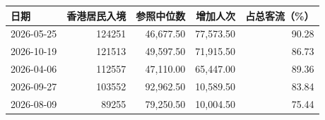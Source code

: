 \begin{tabular}{lrrrr}
\toprule
日期 & 香港居民入境 & 参照中位数 & 增加人次 & 占总客流（\%） \\
\midrule
2026-05-25 & 124251 & 46,677.50 & 77,573.50 & 90.28 \\
2026-10-19 & 121513 & 49,597.50 & 71,915.50 & 86.73 \\
2026-04-06 & 112557 & 47,110.00 & 65,447.00 & 89.36 \\
2026-09-27 & 103552 & 92,962.50 & 10,589.50 & 83.84 \\
2026-08-09 & 89255 & 79,250.50 & 10,004.50 & 75.44 \\
\bottomrule
\end{tabular}
